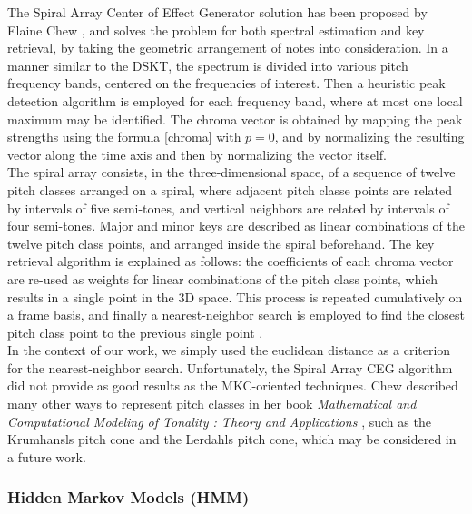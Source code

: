 \documentclass[letterpaper]{article}
\begin{document}
The Spiral Array Center of Effect Generator solution has been proposed by Elaine Chew \citep{SPIRAL}, and solves the problem for both spectral estimation and key retrieval, by taking the geometric arrangement of notes into consideration.
In a manner similar to the DSKT, the spectrum is divided into various pitch frequency bands, centered on the frequencies of interest. Then a heuristic peak detection algorithm is employed for each frequency band, where 
at most one local maximum may be identified. The chroma vector is obtained by mapping the peak strengths using the formula \ref{chroma} with $p = 0$, and by normalizing the resulting vector along the time axis and then by normalizing the vector itself.\\

The spiral array consists, in the three-dimensional space, of a sequence of twelve pitch classes arranged on a spiral, where adjacent pitch classe points are related by intervals of five semi-tones, and vertical neighbors are related by intervals of four semi-tones. Major and minor keys are described as linear combinations of the twelve pitch class points, and arranged inside the spiral beforehand. The key retrieval algorithm is explained as follows: the coefficients of each chroma vector are re-used as weights for linear combinations of the pitch class points, which results in a single point in the 3D space. This process is repeated cumulatively on a frame basis, and finally a nearest-neighbor search is employed to find the closest pitch class point to the previous single point \citep{MIDI}.\\

In the context of our work, we simply used the euclidean distance as a criterion for the nearest-neighbor search. Unfortunately, the Spiral Array CEG algorithm did not provide as good results as the MKC-oriented techniques. Chew described many other ways to represent pitch classes in her book \textit{Mathematical and Computational Modeling of Tonality : Theory and Applications} \citep{CHEW}, such as the Krumhansl\textquotesingle s pitch cone and the Lerdahl\textquotesingle s pitch cone, which may be considered in a future work.

\subsubsection{Hidden Markov Models (HMM)}
\label{sssec:hmm}
\end{document}
